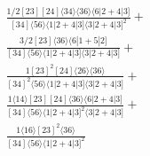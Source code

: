 \documentclass[varwidth, border=5pt]{standalone}
\begin{document}
\begin{my}
$\begin{gathered}
\scriptscriptstyle\frac{1/2[23][24]⟨34⟩⟨36⟩⟨6|2+4|3]}{[34]⟨56⟩⟨1|2+4|3]⟨3|2+4|3]^2}+\\
\scriptscriptstyle\frac{3/2[23]⟨36⟩⟨6|1+5|2]}{[34]⟨56⟩⟨1|2+4|3]⟨3|2+4|3]}+\\
\scriptscriptstyle\frac{1[23]^2[24]⟨26⟩⟨36⟩}{[34]^2⟨56⟩⟨1|2+4|3]⟨3|2+4|3]}+\\
\scriptscriptstyle\frac{1⟨14⟩[23][24]⟨36⟩⟨6|2+4|3]}{[34]⟨56⟩⟨1|2+4|3]^2⟨3|2+4|3]}+\\
\scriptscriptstyle\frac{1⟨16⟩[23]^2⟨36⟩}{[34]⟨56⟩⟨1|2+4|3]^2}\phantom{+}
\end{gathered}$
\end{my}
\end{document}
